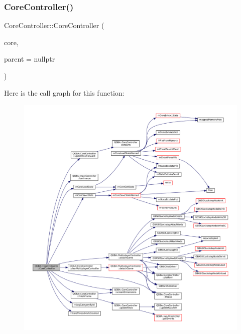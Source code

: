 \subsubsection{\texorpdfstring{Core\+Controller()}{CoreController()}}
{\footnotesize\ttfamily Core\+Controller\+::\+Core\+Controller (\begin{DoxyParamCaption}\item[{m\+Core $\ast$}]{core,  }\item[{Q\+Object $\ast$}]{parent = {\ttfamily nullptr} }\end{DoxyParamCaption})}

Here is the call graph for this function\+:
\nopagebreak
\begin{figure}[H]
\begin{center}
\leavevmode
\includegraphics[width=350pt]{class_q_g_b_a_1_1_core_controller_a6e4a1c279b76e4693ee7860c2cf9f2ed_cgraph}
\end{center}
\end{figure}
\mbox{\label{class_q_g_b_a_1_1_core_controller_a334c26059c56bff3eb22059450e9c7a9}} 

